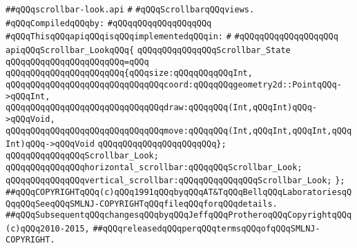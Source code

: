 \label{src/lib/x-kit/widget/old/leaf/scrollbar-look.api}
\verb|##qQQqscrollbar-look.api|\newline
\verb|#|\newline
\verb|#qQQqScrollbarqQQqviews.|\newline
\newline
\verb|#qQQqCompiledqQQqby:|\newline
\verb|#qQQqqQQqqQQqqQQqqQQq|\newline
\newline
\verb|#qQQqThisqQQqapiqQQqisqQQqimplementedqQQqin:|\newline
\verb|#|\newline
\verb|#qQQqqQQqqQQqqQQqqQQq|\newline
\newline
\verb|apiqQQqScrollbar_LookqQQq{|\newline
\newline
\verb|qQQqqQQqqQQqqQQqScrollbar_State|\newline
\verb|qQQqqQQqqQQqqQQqqQQqqQQq=qQQq|\newline
\verb|qQQqqQQqqQQqqQQqqQQqqQQq{qQQqsize:qQQqqQQqqQQqInt,|\newline
\verb|qQQqqQQqqQQqqQQqqQQqqQQqqQQqqQQqcoord:qQQqqQQqgeometry2d::PointqQQq->qQQqInt,|\newline
\verb|qQQqqQQqqQQqqQQqqQQqqQQqqQQqqQQqdraw:qQQqqQQq(Int,qQQqInt)qQQq->qQQqVoid,|\newline
\verb|qQQqqQQqqQQqqQQqqQQqqQQqqQQqqQQqmove:qQQqqQQq(Int,qQQqInt,qQQqInt,qQQqInt)qQQq->qQQqVoid|\newline
\verb|qQQqqQQqqQQqqQQqqQQqqQQq};|\newline
\newline
\verb|qQQqqQQqqQQqqQQqScrollbar_Look;|\newline
\newline
\verb|qQQqqQQqqQQqqQQqhorizontal_scrollbar:qQQqqQQqScrollbar_Look;|\newline
\verb|qQQqqQQqqQQqqQQqvertical_scrollbar:qQQqqQQqqQQqqQQqScrollbar_Look;|\newline
\newline
\verb|};|\newline
\newline
\newline
\verb|##qQQqCOPYRIGHTqQQq(c)qQQq1991qQQqbyqQQqAT&TqQQqBellqQQqLaboratoriesqQQqqQQqSeeqQQqSMLNJ-COPYRIGHTqQQqfileqQQqforqQQqdetails.|\newline
\verb|##qQQqSubsequentqQQqchangesqQQqbyqQQqJeffqQQqProtheroqQQqCopyrightqQQq(c)qQQq2010-2015,|\newline
\verb|##qQQqreleasedqQQqperqQQqtermsqQQqofqQQqSMLNJ-COPYRIGHT.|\newline

